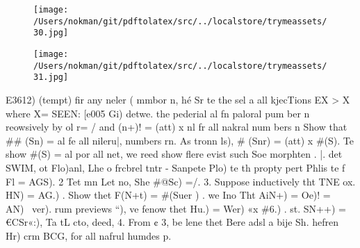 \documentclass[a4paper,12pt]{article}
\begin{document}
\begin{figure}[h]

\texttt{[image: /Users/nokman/git/pdftolatex/src/../localstore/trymeassets/30.jpg]}

\centering

\end{figure}

\par

\vspace{10pt}

\begin{figure}[h]

\texttt{[image: /Users/nokman/git/pdftolatex/src/../localstore/trymeassets/31.jpg]}

\centering

\end{figure}

\par

\vspace{10pt}

    E3612) (tempt)  fir any neler ( mmbor n, hé Sr te the sel a all kjecTions    EX > X where X= SEEN: [e005    Gi) detwe. the pederial al fn paloral pum ber n reowsively by ol r= /  and (n+)! = (att) x nl fr all nakral num bers n    Show that \#\# (Sn) = al fe all nileru|, numbers rn.    As tronn ls), \# (Snr) = (att) x \#(S).  Te show \#(S) = al por all net, we reed show flere evist such Soe morphten .    |. det SWIM, ot Flo)anl, Lhe o frcbrel tntr -  Sanpete Plo) te th propty pert Phlis te f Fl = AGS).    2 Tet mn Let no, She  \#@Sc) =/.    3. Suppose inductively tht TNE ox. HN) = AG.) .    Show thet F(N+t) = \#(Suer ) .  we Ino Tht AiN+) = Oe)! = AN)~ ver).    rum previews “), ve fenow thet Hu.) = Wer) «x \#6.) .  st. SN++) = €CSr«:),    Ta tL cto, deed,    4. From ¢ 3, be lene thet Bere adsl a bije Sh. hefren Hr) crm BCG,  for all nafrul humdes p. 

\vspace{10pt}

\par

\vspace{10pt}
\end{document}
